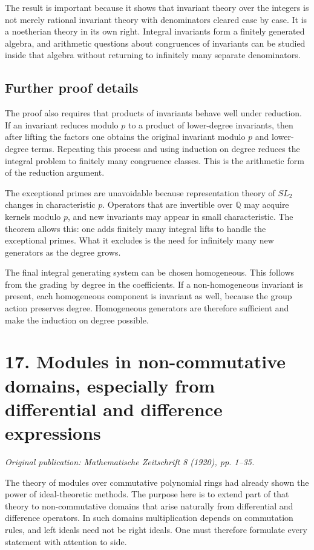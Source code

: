 \documentclass[11pt]{article}
\begin{document}
The result is important because it shows that invariant theory over the integers is not merely
rational invariant theory with denominators cleared case by case. It is a noetherian theory in its
own right. Integral invariants form a finitely generated algebra, and arithmetic questions about
congruences of invariants can be studied inside that algebra without returning to infinitely many
separate denominators.


\subsection{Further proof details}

The proof also requires that products of invariants behave well under reduction. If an invariant
reduces modulo \(p\) to a product of lower-degree invariants, then after lifting the factors one
obtains the original invariant modulo \(p\) and lower-degree terms. Repeating this process and using
induction on degree reduces the integral problem to finitely many congruence classes. This is the
arithmetic form of the reduction argument.

The exceptional primes are unavoidable because representation theory of \(SL_2\) changes in
characteristic \(p\). Operators that are invertible over \(\mathbb Q\) may acquire kernels modulo
\(p\), and new invariants may appear in small characteristic. The theorem allows this: one adds
finitely many integral lifts to handle the exceptional primes. What it excludes is the need for
infinitely many new generators as the degree grows.

The final integral generating system can be chosen homogeneous. This follows from the grading by
degree in the coefficients. If a non-homogeneous invariant is present, each homogeneous component is
invariant as well, because the group action preserves degree. Homogeneous generators are therefore
sufficient and make the induction on degree possible.


\section{17. Modules in non-commutative domains, especially from differential and difference expressions}

\textit{Original publication: Mathematische Zeitschrift 8 (1920), pp. 1--35.}

The theory of modules over commutative polynomial rings had already shown the power of
ideal-theoretic methods. The purpose here is to extend part of that theory to non-commutative
domains that arise naturally from differential and difference operators. In such domains
multiplication depends on commutation rules, and left ideals need not be right ideals. One must
therefore formulate every statement with attention to side.
\end{document}
